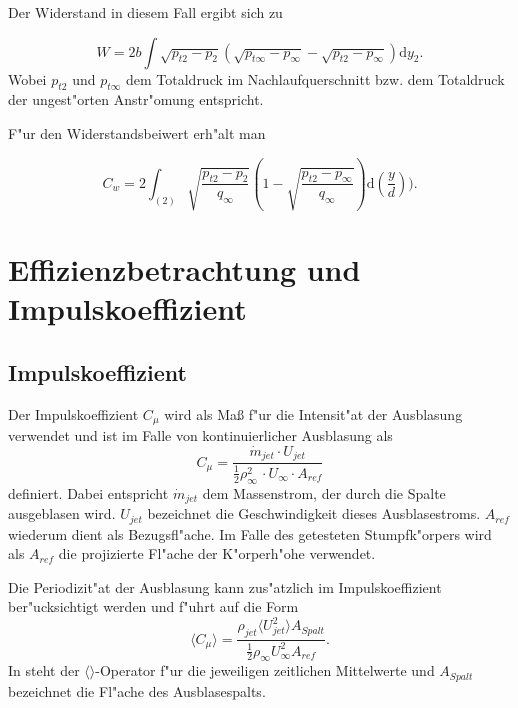 Der Widerstand in diesem Fall ergibt sich zu

\begin{equation}
	\label{eq:widerstand_korrigiert}
	W = 2b \int \sqrt{p_{t2} - p_2} \left(\sqrt{p_{t\infty} - p_{\infty}} - \sqrt{p_{t2} - p_{\infty}}\right) \mathrm{d} y_2 .
\end{equation}
Wobei $p_{t2}$ und $p_{t\infty}$ dem Totaldruck im Nachlaufquerschnitt bzw. dem Totaldruck der ungest"orten Anstr"omung entspricht.

F"ur den Widerstandsbeiwert erh"alt man

\begin{equation}
	\label{eq:C_w_korrigiert}
	C_w = 2 \int_{(2)} \sqrt{\frac{p_{t2} - p_2}{q_{\infty}}}
	\left(1 - \sqrt{\frac{p_{t2} - p_{\infty}}{q_{\infty}}}\right)  \mathrm{d}\left(\frac{y}{d}\right)).
\end{equation}

\section{Effizienzbetrachtung und Impulskoeffizient}

\subsection{Impulskoeffizient}
Der Impulskoeffizient $C_{\mu}$ wird als Ma\ss{} f"ur die Intensit"at der Ausblasung verwendet \cite{ElSayedM..2018} und ist im Falle von kontinuierlicher Ausblasung als 
\begin{equation}
	\label{eq: Def-momentum-coeff}
	C_{\mu} = \frac{\dot{m}_{jet} \cdot U_{jet}}{\frac{1}{2}\rho^2_{\infty}\, \cdot U_{\infty} \cdot A_{ref}}
\end{equation}
definiert.
Dabei entspricht $\dot{m}_{jet}$ dem Massenstrom, der durch die Spalte ausgeblasen wird. $U_{jet}$ bezeichnet die Geschwindigkeit dieses Ausblasestroms.
$A_{ref}$ wiederum dient als Bezugsfl"ache. Im Falle des getesteten Stumpfk"orpers wird als $A_{ref}$ die projizierte Fl"ache der K"orperh"ohe verwendet.\cite{Bilges}

Die Periodizit"at der Ausblasung kann zus"atzlich im Impulskoeffizient ber"ucksichtigt werden und f"uhrt auf die Form \cite{Chabert.2014}
\begin{equation}
	\label{eq:momentum-coeff-oscill}
	\langle{C_{\mu}}\rangle = \frac{\rho_{jet}\langle{U^2_{jet}}\rangle A_{Spalt}}{\frac{1}{2}\rho_{\infty}U^2_{\infty}A_{ref}}.	
\end{equation}
In  steht der $\langle{}\rangle$-Operator f"ur die jeweiligen zeitlichen Mittelwerte und $A_{Spalt}$ bezeichnet die Fl"ache des Ausblasespalts.

